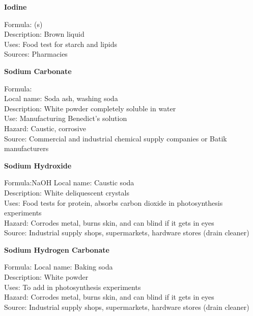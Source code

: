 \begin{flushleft}
\textbf{Iodine}
\end{flushleft}
\vspace{-10pt}
Formula: (s)\\
Description: Brown liquid\\
Uses: Food test for starch and lipids\\
Sources: Pharmacies

\begin{flushleft}
\textbf{Sodium Carbonate}
\end{flushleft}
\vspace{-10pt}
Formula: \\
Local name: Soda ash, washing soda\\
Description: White powder completely soluble in water\\
Use: Manufacturing Benedict's solution\\
Hazard: Caustic, corrosive\\
Source: Commercial and industrial chemical supply companies or Batik manufacturers\\

\begin{flushleft}
\textbf{Sodium Hydroxide}
\end{flushleft}
\vspace{-10pt}
Formula:NaOH
Local name: Caustic soda\\
Description: White deliquescent crystals \\
Uses: Food tests for protein, absorbs carbon dioxide in photosynthesis experiments\\
Hazard: Corrodes metal, burns skin, and can blind if it gets in eyes\\
Source: Industrial supply shops, supermarkets, hardware stores (drain cleaner)\\

\begin{flushleft}
\textbf{Sodium Hydrogen Carbonate}
\end{flushleft}
\vspace{-10pt}
Formula: 
Local name: Baking soda\\
Description: White powder \\
Uses: To add  in photosynthesis experiments\\
Hazard: Corrodes metal, burns skin, and can blind if it gets in eyes\\
Source: Industrial supply shops, supermarkets, hardware stores (drain cleaner)\\
